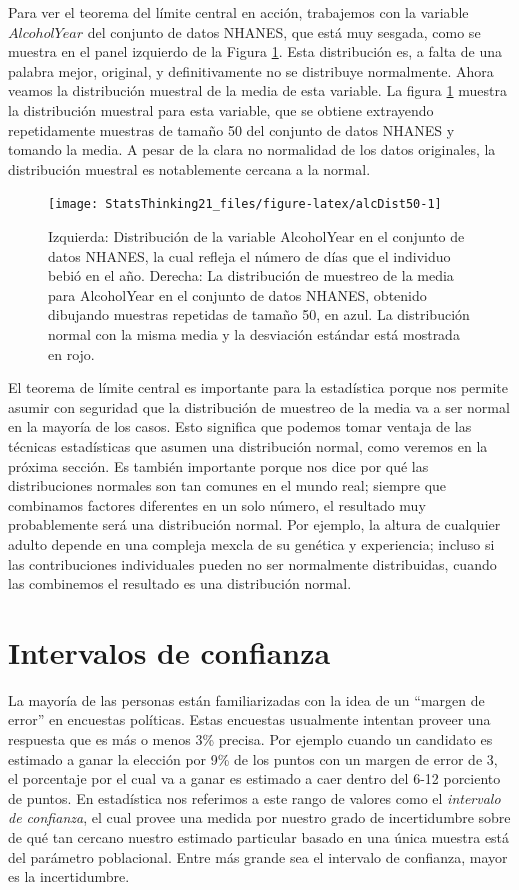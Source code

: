 \documentclass[
  12pt,
]{book}
\theoremstyle{definition}
\theoremstyle{definition}
\theoremstyle{definition}
\theoremstyle{remark}
\begin{document}
Para ver el teorema del límite central en acción, trabajemos con la variable \(AlcoholYear\) del conjunto de datos NHANES, que está muy sesgada, como se muestra en el panel izquierdo de la Figura \ref{fig:alcDist50}. Esta distribución es, a falta de una palabra mejor, original, y definitivamente no se distribuye normalmente. Ahora veamos la distribución muestral de la media de esta variable. La figura \ref{fig:alcDist50} muestra la distribución muestral para esta variable, que se obtiene extrayendo repetidamente muestras de tamaño 50 del conjunto de datos NHANES y tomando la media. A pesar de la clara no normalidad de los datos originales, la distribución muestral es notablemente cercana a la normal.

\begin{figure}
\texttt{[image: StatsThinking21\_files/figure-latex/alcDist50-1]} \caption{Izquierda: Distribución de la variable AlcoholYear en el conjunto de datos NHANES, la cual refleja el número de días que el individuo bebió en el año. Derecha: La distribución de muestreo de la media para AlcoholYear en el conjunto de datos NHANES, obtenido dibujando muestras repetidas de tamaño 50, en azul. La distribución normal con la misma media y la desviación estándar está mostrada en rojo.}\label{fig:alcDist50}
\end{figure}

El teorema de límite central es importante para la estadística porque nos permite asumir con seguridad que la distribución de muestreo de la media va a ser normal en la mayoría de los casos. Esto significa que podemos tomar ventaja de las técnicas estadísticas que asumen una distribución normal, como veremos en la próxima sección. Es también importante porque nos dice por qué las distribuciones normales son tan comunes en el mundo real; siempre que combinamos factores diferentes en un solo número, el resultado muy probablemente será una distribución normal. Por ejemplo, la altura de cualquier adulto depende en una compleja mexcla de su genética y experiencia; incluso si las contribuciones individuales pueden no ser normalmente distribuidas, cuando las combinemos el resultado es una distribución normal.

\hypertarget{confidence-intervals}{%
\section{Intervalos de confianza}\label{confidence-intervals}}

La mayoría de las personas están familiarizadas con la idea de un ``margen de error'' en encuestas políticas. Estas encuestas usualmente intentan proveer una respuesta que es más o menos 3\% precisa. Por ejemplo cuando un candidato es estimado a ganar la elección por 9\% de los puntos con un margen de error de 3, el porcentaje por el cual va a ganar es estimado a caer dentro del 6-12 porciento de puntos. En estadística nos referimos a este rango de valores como el \emph{intervalo de confianza}, el cual provee una medida por nuestro grado de incertidumbre sobre de qué tan cercano nuestro estimado particular basado en una única muestra está del parámetro poblacional. Entre más grande sea el intervalo de confianza, mayor es la incertidumbre.
\end{document}
